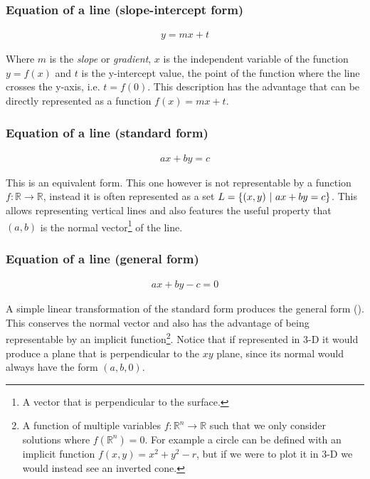 \subsubsection*{Equation of a line (slope-intercept form)}
\begin{align}
    y = mx + t
\end{align}

Where $m$ is the \emph{slope} or \emph{gradient}, $x$ is the independent variable of the function $y = f(x)$ and $t$ is the y-intercept value, the point of the function where the line crosses the y-axis, i.e. $t = f(0)$. This description has the advantage that can be directly represented as a function $f(x) = mx + t$.

\subsubsection*{Equation of a line (standard form)}
\begin{align}
    ax + by = c
\end{align}

This is an equivalent form. This one however is not representable by a function $f: \mathbb{R} \rightarrow \mathbb{R}$, instead it is often represented as a set $L = \{(x, y) \ |\  ax + by = c\}$. This allows representing vertical lines and also features the useful property that $(a, b)$ is the normal vector\footnote{A vector that is perpendicular to the surface.} of the line.

\subsubsection*{Equation of a line (general form)}
\begin{align}
    ax + by - c = 0
\end{align}

A simple linear transformation of the standard form produces the general form (\cite{noauthor_wikipedia_2021}). This conserves the normal vector and also has the advantage of being representable by an implicit function\footnote{A function of multiple variables $f: \mathbb{R}^n \rightarrow \mathbb{R}$ such that we only consider solutions where $f(\mathbb{R}^n) = 0$. For example a circle can be defined with an implicit function $f(x, y) = x^2 + y^2 - r$, but if we were to plot it in 3-D we would instead see an inverted cone.}. Notice that if represented in 3-D it would produce a plane that is perpendicular to the $xy$ plane, since its normal would always have the form $(a, b, 0)$.

